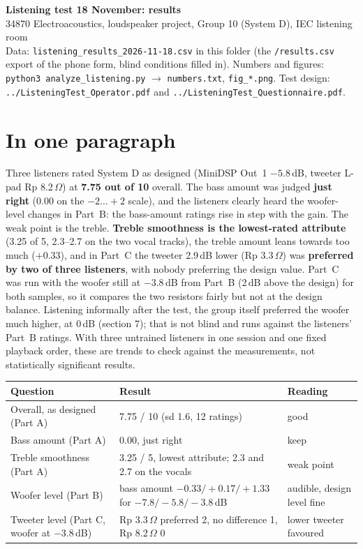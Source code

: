 \documentclass[11pt,a4paper]{article}
\begin{document}
{\LARGE\bfseries Listening test 18 November: results}\\[2pt]
{\large 34870 Electroacoustics, loudspeaker project, Group 10 (System D), IEC listening room}\\[2pt]
{\small Data: \texttt{listening\_results\_2026-11-18.csv} in this folder (the \texttt{/results.csv} export of the phone
form, blind conditions filled in). Numbers and figures: \texttt{python3 analyze\_listening.py} $\rightarrow$
\texttt{numbers.txt}, \texttt{fig\_*.png}. Test design: \texttt{../ListeningTest\_Operator.pdf} and
\texttt{../ListeningTest\_Questionnaire.pdf}.}

\section*{In one paragraph}
Three listeners rated System D as designed (MiniDSP Out~1 $-5.8$\,dB, tweeter L-pad Rp 8.2\,$\Omega$) at
\textbf{7.75 out of 10} overall. The bass amount was judged \textbf{just right} (0.00 on the $-2\ldots+2$ scale),
and the listeners clearly heard the woofer-level changes in Part~B: the bass-amount ratings rise in step with
the gain. The weak point is the treble. \textbf{Treble smoothness is the lowest-rated attribute} (3.25 of 5,
2.3--2.7 on the two vocal tracks), the treble amount leans towards too much ($+0.33$), and in Part~C the
tweeter 2.9\,dB lower (Rp 3.3\,$\Omega$) was \textbf{preferred by two of three listeners}, with nobody
preferring the design value. Part~C was run with the woofer still at $-3.8$\,dB from Part~B (2\,dB above the
design) for both samples, so it compares the two resistors fairly but not at the design balance. Listening informally after the test, the group itself preferred the woofer much higher, at 0\,dB
(section 7); that is not blind and runs against the listeners' Part~B ratings. With three untrained listeners in one session and one fixed playback order,
these are trends to check against the measurements, not statistically significant results.

\begin{center}\small
\begin{tabular}{@{}>{\raggedright}p{5.6cm}>{\raggedright}p{6.4cm}>{\raggedright\arraybackslash}p{3.6cm}@{}}\toprule
Question & Result & Reading\\\midrule
Overall, as designed (Part A) & 7.75 / 10 (sd 1.6, 12 ratings) & good\\
Bass amount (Part A) & 0.00, just right & keep\\
Treble smoothness (Part A) & 3.25 / 5, lowest attribute; 2.3 and 2.7 on the vocals & weak point\\
Woofer level (Part B) & bass amount $-0.33 / +0.17 / +1.33$ for $-7.8 / -5.8 / -3.8$\,dB & audible, design level fine\\
Tweeter level (Part C, woofer at $-3.8$\,dB) & Rp 3.3\,$\Omega$ preferred 2, no difference 1, Rp 8.2\,$\Omega$ 0 & lower tweeter favoured\\\bottomrule
\end{tabular}
\end{center}
\end{document}
